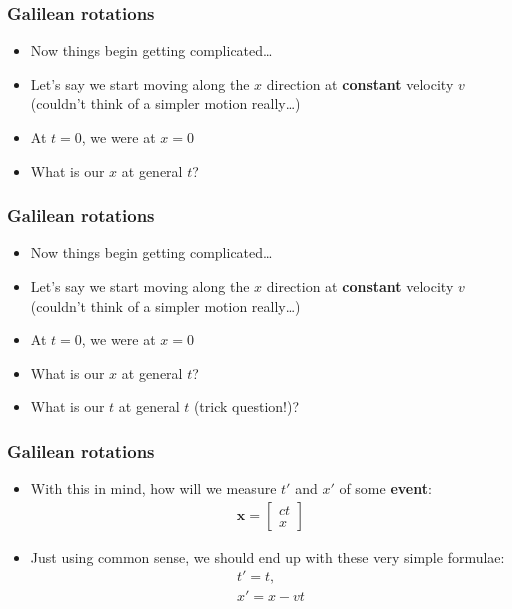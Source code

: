 \documentclass{beamer}
\begin{document}
\begin{frame}
  \frametitle{Galilean rotations}
  \begin{itemize}
    \item<1-> Now things begin getting complicated\ldots
    \item<2-> Let's say we start moving along the $x$ direction at \textbf{constant} velocity $v$ (couldn't think of a simpler motion really\ldots)
    \item<3-> At $t=0$, we were at $x=0$
    \item<4-> What is our $x$ at general $t$?
  \end{itemize}
\end{frame}

\begin{frame}
  \frametitle{Galilean rotations}
  \begin{itemize}
    \item<1-> Now things begin getting complicated\ldots
    \item<2-> Let's say we start moving along the $x$ direction at \textbf{constant} velocity $v$ (couldn't think of a simpler motion really\ldots)
    \item<3-> At $t=0$, we were at $x=0$
    \item<4-> What is our $x$ at general $t$?
    \item<4-> What is our $t$ at general $t$ (trick question!)?
  \end{itemize}
\end{frame}

\begin{frame}
  \frametitle{Galilean rotations}
  \begin{itemize}
    \item<1-> With this in mind, how will we measure $t'$ and $x'$ of some \textbf{event}:
      \begin{align*}
	\mathbf{x}=
	\begin{bmatrix}
	  ct\\
	  x
	\end{bmatrix}
      \end{align*}
    \item<2-> Just using common sense, we should end up with these very simple formulae:
      \begin{gather*}
	t'=t,\\
	x'=x-vt
      \end{gather*}
  \end{itemize}
\end{frame}
\end{document}

